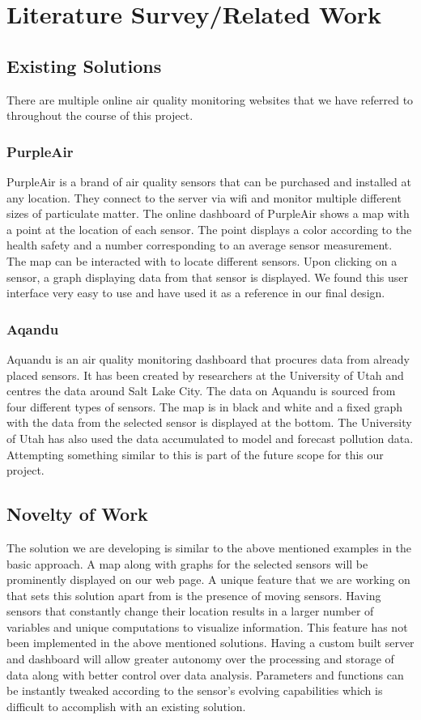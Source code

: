 \documentclass[]{report}
\begin{document}
 

\chapter{Literature Survey/Related Work} 
\section{Existing Solutions}
There are multiple online air quality monitoring websites that we have referred to throughout the course of this project.

\subsection{PurpleAir}
PurpleAir\cite{purpleair} is a brand of air quality sensors that can be purchased and installed at any location. They connect to the server via wifi and monitor multiple different sizes of particulate matter. The online dashboard of PurpleAir shows a map with a point at the location of each sensor. The point displays a color according to the health safety and a number corresponding to an average sensor measurement. The map can be interacted with to locate different sensors. Upon clicking on a sensor, a graph displaying data from that sensor is displayed. We found this user interface very easy to use and have used it as a reference in our final design.

\subsection{Aqandu}
Aquandu\cite{aqandu} is an air quality monitoring dashboard that procures data from already placed sensors. It has been created by researchers at the University of Utah and centres the data around Salt Lake City. The data on Aquandu is sourced from four different types of sensors. The map is in black and white and a fixed graph with the data from the selected sensor is displayed at the bottom. The University of Utah has also used the data accumulated to model and forecast pollution data.\cite{aqandu:mlvideo} Attempting something similar to this is part of the future scope for this our project.

\section{Novelty of Work}
The solution we are developing is similar to the above mentioned examples in the basic approach. A map along with graphs for the selected sensors will be prominently displayed on our web page. A unique feature that we are working on that sets this solution apart from is the presence of moving sensors. Having sensors that constantly change their location results in a larger number of variables and unique computations to visualize information. This feature has not been implemented in the above mentioned solutions. Having a custom built server and dashboard will allow greater autonomy over the processing and storage of data along with better control over data analysis. Parameters and functions can be instantly tweaked according to the sensor's evolving capabilities which is difficult to accomplish with an existing solution.
\end{document}
